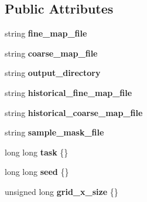 \subsection*{Public Attributes}
\begin{DoxyCompactItemize}
\item 
string {\bfseries fine\+\_\+map\+\_\+file}\hypertarget{struct_sim_parameters_a24483485b1127d7c4a91f02bd56a130e}{}\label{struct_sim_parameters_a24483485b1127d7c4a91f02bd56a130e}

\item 
string {\bfseries coarse\+\_\+map\+\_\+file}\hypertarget{struct_sim_parameters_a03831d4d7590072a153620fdedd7e2fd}{}\label{struct_sim_parameters_a03831d4d7590072a153620fdedd7e2fd}

\item 
string {\bfseries output\+\_\+directory}\hypertarget{struct_sim_parameters_afc36bb2fbfc7ebf5e84149be5be87c1e}{}\label{struct_sim_parameters_afc36bb2fbfc7ebf5e84149be5be87c1e}

\item 
string {\bfseries historical\+\_\+fine\+\_\+map\+\_\+file}\hypertarget{struct_sim_parameters_a0904ed1272de111c9e80c22dcdb2e039}{}\label{struct_sim_parameters_a0904ed1272de111c9e80c22dcdb2e039}

\item 
string {\bfseries historical\+\_\+coarse\+\_\+map\+\_\+file}\hypertarget{struct_sim_parameters_a621bfeaf44861f6b88d4117bc7da5a2b}{}\label{struct_sim_parameters_a621bfeaf44861f6b88d4117bc7da5a2b}

\item 
string {\bfseries sample\+\_\+mask\+\_\+file}\hypertarget{struct_sim_parameters_ac5298525ed1d094d1668bc78491b0c69}{}\label{struct_sim_parameters_ac5298525ed1d094d1668bc78491b0c69}

\item 
long long {\bfseries task} \{\}\hypertarget{struct_sim_parameters_acd3ec52b8146e506460d5949836ea0ce}{}\label{struct_sim_parameters_acd3ec52b8146e506460d5949836ea0ce}

\item 
long long {\bfseries seed} \{\}\hypertarget{struct_sim_parameters_ab3fb7b5cee0725fee84f53f35f695d27}{}\label{struct_sim_parameters_ab3fb7b5cee0725fee84f53f35f695d27}

\item 
unsigned long {\bfseries grid\+\_\+x\+\_\+size} \{\}\hypertarget{struct_sim_parameters_aba773a5ec7ad130d6009d319c7d2f591}{}\label{struct_sim_parameters_aba773a5ec7ad130d6009d319c7d2f591}


\end{DoxyCompactItemize}
